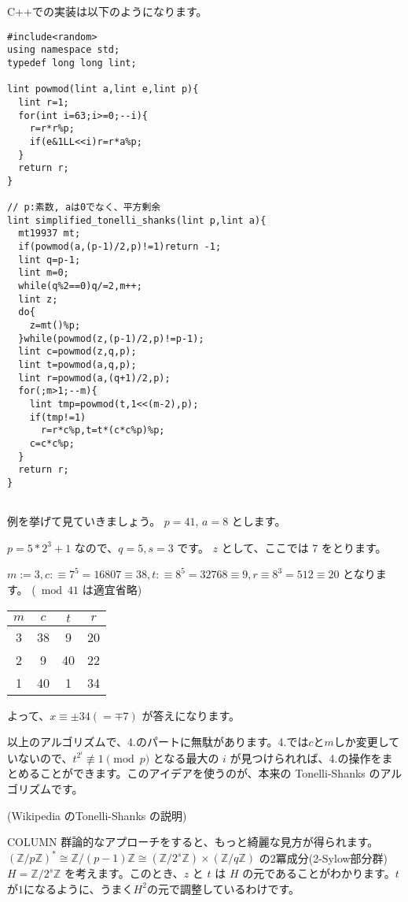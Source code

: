\documentclass{report}
\newcommand{\Z}{\mathbb{Z}}
\begin{document}
C++での実装は以下のようになります。
\begin{verbatim}
#include<random>
using namespace std;
typedef long long lint;

lint powmod(lint a,lint e,lint p){
  lint r=1;
  for(int i=63;i>=0;--i){
    r=r*r%p;
    if(e&1LL<<i)r=r*a%p;
  }
  return r;
}

// p:素数, aは0でなく、平方剰余
lint simplified_tonelli_shanks(lint p,lint a){
  mt19937 mt;
  if(powmod(a,(p-1)/2,p)!=1)return -1;
  lint q=p-1;
  lint m=0;
  while(q%2==0)q/=2,m++;
  lint z;
  do{
    z=mt()%p;
  }while(powmod(z,(p-1)/2,p)!=p-1);
  lint c=powmod(z,q,p);
  lint t=powmod(a,q,p);
  lint r=powmod(a,(q+1)/2,p);
  for(;m>1;--m){
    lint tmp=powmod(t,1<<(m-2),p);
    if(tmp!=1)
      r=r*c%p,t=t*(c*c%p)%p;
    c=c*c%p;
  }
  return r;
}
	
\end{verbatim}

例を挙げて見ていきましょう。
$p = 41$, $a = 8$ とします。

$p = 5 * 2^3 + 1$ なので、$q = 5, s = 3$ です。
$z$ として、ここでは 7 をとります。

$m := 3, c :\equiv 7^5 = 16807 \equiv 38, t :\equiv 8^5 = 32768 \equiv 9, r \equiv 8^3 = 512 \equiv 20$ となります。 (${} \bmod 41$ は適宜省略)

 \begin{table}[htb]
  \begin{center}
  \begin{tabular}[t]{|c|c|c|c|}
   \hline
   $m$ & $c$ & $t$ & $r$ \\ \hline
   3 & 38 & 9 & 20 \\
   2 & 9 & 40 & 22 \\
   1 & 40 & 1 & 34 \\ \hline
  \end{tabular}
  \end{center}
 \end{table}


よって、$x \equiv \pm 34 (=\mp 7)$ が答えになります。


以上のアルゴリズムで、4.のパートに無駄があります。4.では$c$と$m$しか変更していないので、$t^{2^i}\not \equiv 1 \pmod p$ となる最大の $i$ が見つけられれば、4.の操作をまとめることができます。このアイデアを使うのが、本来の Tonelli-Shanks のアルゴリズムです。

(Wikipedia のTonelli-Shanks の説明)

\begin{itembox}[l]{COLUMN}
 群論的なアプローチをすると、もっと綺麗な見方が得られます。
$(\Z/p\Z)^* \cong \Z/(p-1)\Z \cong (\Z/2^s\Z) \times (\Z/q\Z)$ の2冪成分(2-Sylow部分群) $H = \Z/2^s\Z$ を考えます。このとき、$z$ と $t$ は $H$ の元であることがわかります。$t$が$1$になるように、うまく$H^2$の元で調整しているわけです。
\end{itembox}
\end{document}
